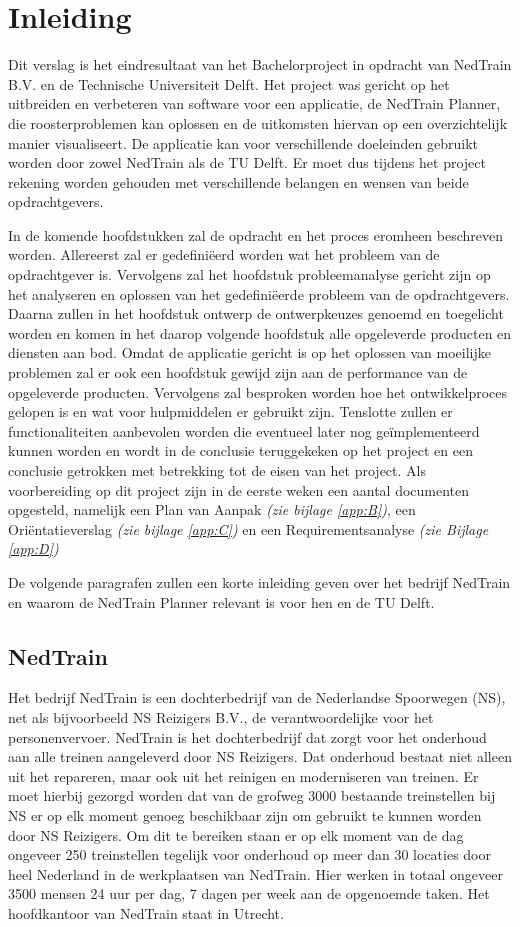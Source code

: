 \section{Inleiding}
Dit verslag is het eindresultaat van het Bachelorproject in opdracht van NedTrain B.V. en de Technische Universiteit Delft. Het project was gericht op het uitbreiden en verbeteren van software voor een applicatie, de NedTrain Planner, die roosterproblemen kan oplossen en de uitkomsten hiervan op een overzichtelijk manier visualiseert. De applicatie kan voor verschillende doeleinden gebruikt worden door zowel NedTrain als de TU Delft. Er moet dus tijdens het project rekening worden gehouden met verschillende belangen en wensen van beide opdrachtgevers.

In de komende hoofdstukken zal de opdracht en het proces eromheen beschreven worden. Allereerst zal er gedefini\"eerd worden wat het probleem van de opdrachtgever is. Vervolgens zal het hoofdstuk probleemanalyse gericht zijn op het analyseren en oplossen van het gedefini\"eerde probleem van de opdrachtgevers. Daarna zullen in het hoofdstuk ontwerp de ontwerpkeuzes genoemd en toegelicht worden en komen in het daarop volgende hoofdstuk alle opgeleverde producten en diensten aan bod. Omdat de applicatie gericht is op het oplossen van moeilijke problemen zal er ook een hoofdstuk gewijd zijn aan de performance van de opgeleverde producten. Vervolgens zal besproken worden hoe het ontwikkelproces gelopen is en wat voor hulpmiddelen er gebruikt zijn. Tenslotte zullen er functionaliteiten aanbevolen worden die eventueel later nog ge\"implementeerd kunnen worden en wordt in de conclusie teruggekeken op het project en een conclusie getrokken met betrekking tot de eisen van het project. Als voorbereiding op dit project zijn in de eerste weken een aantal documenten opgesteld, namelijk een Plan van Aanpak \emph{(zie bijlage \ref{app:B})}, een Ori\"entatieverslag \emph{(zie bijlage \ref{app:C})} en een Requirementsanalyse \emph{(zie Bijlage \ref{app:D})}

De volgende paragrafen zullen een korte inleiding geven over het bedrijf NedTrain en waarom de NedTrain Planner relevant is voor hen en de TU Delft.

\subsection{NedTrain}
Het bedrijf NedTrain is een dochterbedrijf van de Nederlandse Spoorwegen (NS), net als bijvoorbeeld NS Reizigers B.V., de verantwoordelijke voor het personenvervoer. NedTrain is het dochterbedrijf dat zorgt voor het onderhoud aan alle treinen aangeleverd door NS Reizigers. Dat onderhoud bestaat niet alleen uit het repareren, maar ook uit het reinigen en moderniseren van treinen. Er moet hierbij gezorgd worden dat van de grofweg 3000 bestaande treinstellen bij NS er op elk moment genoeg beschikbaar zijn om gebruikt te kunnen worden door NS Reizigers. Om dit te bereiken staan er op elk moment van de dag ongeveer 250 treinstellen tegelijk voor onderhoud op meer dan 30 locaties door heel Nederland in de werkplaatsen van NedTrain. Hier werken in totaal ongeveer 3500 mensen 24 uur per dag, 7 dagen per week aan de opgenoemde taken. Het hoofdkantoor van NedTrain staat in Utrecht.

